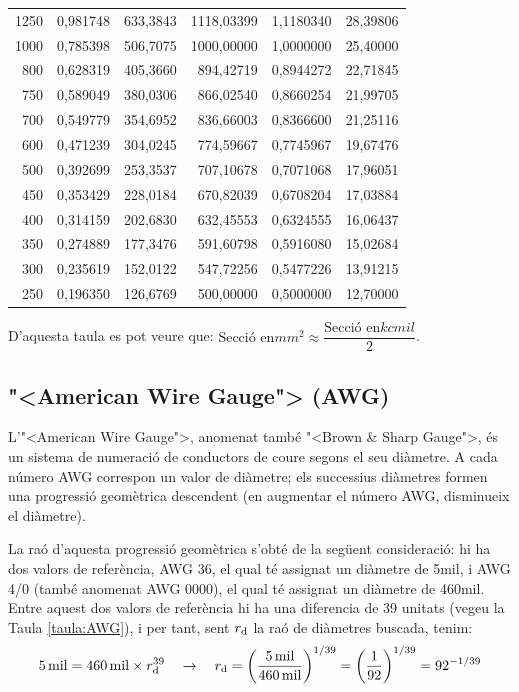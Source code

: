 \begin{longtable}{r<{\hspace{0.6em}}rrrrr}
1250 &   0,981748 &   633,3843 & 1118,03399 &  1,1180340 &   28,39806 \\
1000 &   0,785398 &   506,7075 & 1000,00000 &  1,0000000 &   25,40000 \\
 800 &   0,628319 &   405,3660 &  894,42719 &  0,8944272 &   22,71845 \\
 750 &   0,589049 &   380,0306 &  866,02540 &  0,8660254 &   21,99705 \\
 700 &   0,549779 &   354,6952 &  836,66003 &  0,8366600 &   21,25116 \\
 600 &   0,471239 &   304,0245 &  774,59667 &  0,7745967 &   19,67476 \\
 500 &   0,392699 &   253,3537 &  707,10678 &  0,7071068 &   17,96051 \\
 450 &   0,353429 &   228,0184 &  670,82039 &  0,6708204 &   17,03884 \\
 400 &   0,314159 &   202,6830 &  632,45553 &  0,6324555 &   16,06437 \\
 350 &   0,274889 &   177,3476 &  591,60798 &  0,5916080 &   15,02684 \\
 300 &   0,235619 &   152,0122 &  547,72256 &  0,5477226 &   13,91215 \\
 250 &   0,196350 &   126,6769 &  500,00000 &  0,5000000 &   12,70000 \\
\bottomrule[1pt]
\end{longtable}

D'aquesta taula es pot veure que: $\text{Secci\'{o} en}\unit{mm^2} \approx \dfrac{\text{Secci\'{o} en}\unit{kcmil}}{2}$.

\break
\subsection{{"<}American Wire Gauge{">} (AWG)}

L'{"<}American Wire Gauge{">}, anomenat tamb\'{e} {"<}Brown \& Sharp Gauge{">}, \'{e}s un sistema de numeraci\'{o} de conductors de coure segons el seu di\`{a}metre. A cada n\'{u}mero AWG correspon un valor de di\`{a}metre; els successius di\`{a}metres formen una progressi\'{o} geom\`{e}trica descendent (en augmentar el n\'{u}mero AWG, disminueix el di\`{a}metre).

La ra\'{o} d'aquesta progressi\'{o} geom\`{e}trica s'obt\'{e} de la seg\"{u}ent consideraci\'{o}: hi ha dos valors de refer\`{e}ncia, AWG 36, el qual t\'{e} assignat un di\`{a}metre de 5\unit{mil}, i AWG 4/0 (tamb\'{e} anomenat AWG 0000), el qual t\'{e} assignat un di\`{a}metre de 460\unit{mil}. Entre aquest dos valors de refer\`{e}ncia hi ha una diferencia de 39 unitats (vegeu la Taula \vref{taula:AWG}), i per tant, sent $r_\mathrm{d}$ la ra\'{o} de di\`{a}metres buscada, tenim:
\begin{equation}
   5\mathrm{\,mil} = 460\mathrm{\,mil} \times r_\mathrm{d}^{39} \quad \rightarrow \quad r_\mathrm{d} = \left( \frac{5\mathrm{\,mil}}{460\mathrm{\,mil}} \right)^{1/39} = \left( \frac{1}{92} \right)^{1/39} = 92^{-1/39}
\end{equation}

